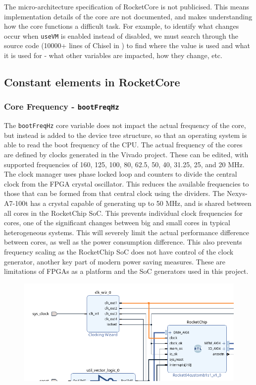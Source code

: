 The micro-architecture specification of RocketCore is not publicised. This means implementation details of the core are not documented, and makes understanding how the core functions a difficult task. For example, to identify what changes occur when \texttt{useVM} is enabled instead of disabled, we must search through the source code (10000+ lines of Chisel in ) to find where the value is used and what it is used for - what other variables are impacted, how they change, etc. 

\subsection{Constant elements in RocketCore}
\subsubsection{Core Frequency - \texttt{bootFreqHz}}
The \texttt{bootFreqHz} core variable does not impact the actual frequency of the core, but instead is added to the device tree structure, so that an operating system is able to read the boot frequency of the CPU. The actual frequency of the cores are defined by clocks generated in the Vivado project. These can be edited, with supported frequencies of 160, 125, 100, 80, 62.5, 50, 40, 31.25, 25, and 20 MHz. The clock manager uses phase locked loop and counters to divide the central clock from the FPGA crystal oscillator. This reduces the available frequencies to those that can be formed from that central clock using the dividers. The Nexys-A7-100t has a crystal capable of generating up to 50 MHz, and is shared between all cores in the RocketChip SoC. This prevents individual clock frequencies for cores, one of the significant changes between big and small cores in typical heterogeneous systems. This will severely limit the actual performance difference between cores, as well as the power consumption difference. This also prevents frequency scaling as the RocketChip SoC does not have control of the clock generator, another key part of modern power saving measures. These are limitations of FPGAs as a platform and the SoC generators used in this project.

\begin{figure}
    \includegraphics[]{./img/single_clock_rocketchip.png}
\end{figure}

